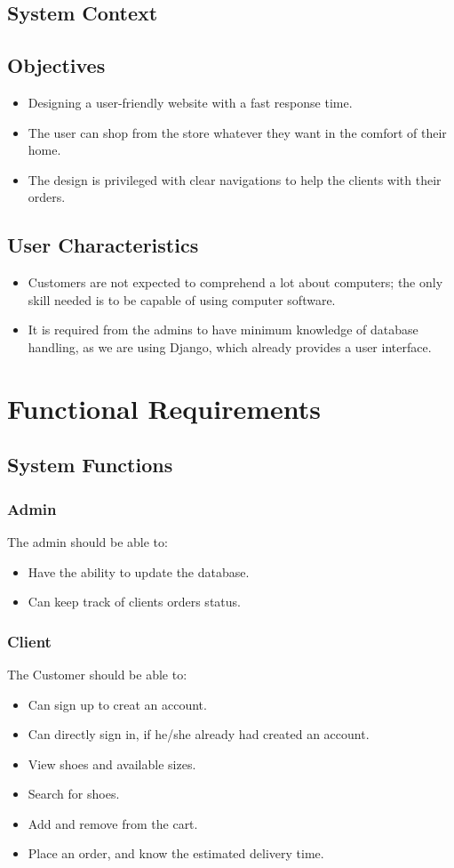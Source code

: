 \documentclass[12pt]{article}
\begin{document}
\subsection{System Context}

\subsection{Objectives}
\begin{itemize}
 \item Designing a user-friendly website with a fast response time.
 \item The user can shop from the store whatever they want in the comfort of their home.
 \item The design is privileged with clear navigations to help the clients with their orders.
\end{itemize}

\subsection{ User Characteristics}
\begin{itemize}
\item Customers are not expected to comprehend a lot about computers; the only skill needed is to be capable of using computer software.
\item It is required from the admins to have minimum knowledge of database handling, as we are using Django, which already provides a user interface. 
\end{itemize}

\pagebreak 
\section{Functional Requirements}
\subsection{System Functions}\label{System Functions}
\subsubsection{Admin}
The admin should be able to:
\begin{itemize}
\item Have the ability to update the database.
\item Can keep track of clients orders status.
\end{itemize}
\subsubsection{Client}
The Customer should be able to:
\begin{itemize}
\item Can sign up to creat an account.
\item Can directly sign in, if he/she already had created an account.
\item View shoes and available sizes.
\item Search for shoes.
\item Add and remove from the cart.
\item Place an order, and know the estimated delivery time.
\end{itemize}
\end{document}
